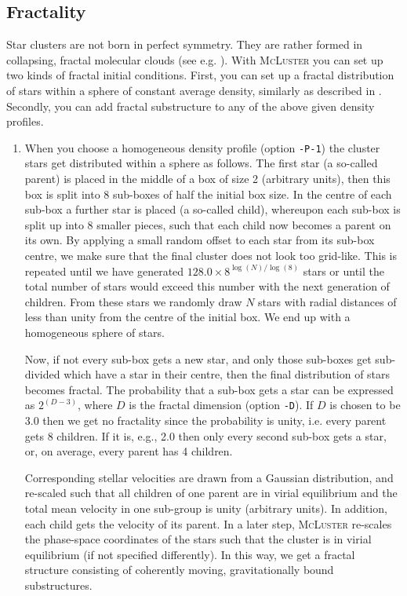 \documentclass[useAMS,usenatbib]{mn2e}
\begin{document}
\subsection*{Fractality}
Star clusters are not born in perfect symmetry. They are rather formed in collapsing, fractal molecular clouds (see e.g. \citealt{Gutermuth08, Koenyves10}). With \textsc{McLuster} you can set up two kinds of fractal initial conditions. First, you can set up a fractal distribution of stars within a sphere of constant average density, similarly as described in \citet{Goodwin04}. Secondly, you can add fractal substructure to any of the above given density profiles.
\begin{enumerate}
\item When you choose a homogeneous density profile (option \texttt{-P-1}) the cluster stars get distributed within a sphere as follows. The first star (a so-called parent) is placed in the middle of a box of size 2 (arbitrary units), then this box is split into 8 sub-boxes of half the initial box size. In the centre of each sub-box a further star is placed (a so-called child), whereupon each sub-box is split up into 8 smaller pieces, such that each child now becomes a parent on its own. By applying a small random offset to each star from its sub-box centre, we make sure that the final cluster does not look too grid-like. This is repeated until we have generated $128.0\times8^{\log(N)/\log(8)}$ stars or until the total number of stars would exceed this number with the next generation of children. From these stars we randomly draw $N$ stars with radial distances of less than unity from the centre of the initial box. We end up with a homogeneous sphere of stars.

Now, if not every sub-box gets a new star, and only those sub-boxes get sub-divided which have a star in their centre, then the final distribution of stars becomes fractal. The probability that a sub-box gets a star can be expressed as $2^{(D-3)}$, where $D$ is the fractal dimension (option \texttt{-D}). If $D$ is chosen to be 3.0 then we get no fractality since the probability is unity, i.e. every parent gets 8 children. If it is, e.g., 2.0 then only every second sub-box gets a star, or, on average, every parent has 4 children. 

Corresponding stellar velocities are drawn from a Gaussian distribution, and re-scaled such that all children of one parent are in virial equilibrium and the total mean velocity in one sub-group is unity (arbitrary units). In addition, each child gets the velocity of its parent. In a later step, \textsc{McLuster} re-scales the phase-space coordinates of the stars such that the cluster is in virial equilibrium (if not specified differently). In this way, we get a fractal structure consisting of coherently moving, gravitationally bound substructures. 


\end{enumerate}
\end{document}
